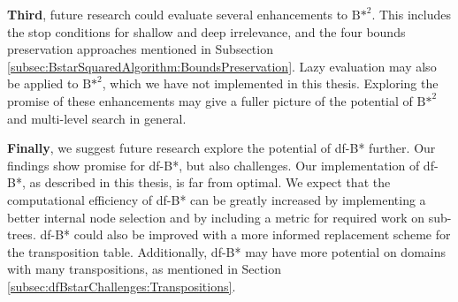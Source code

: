 \textbf{Third}, future research could evaluate several enhancements to ${\text{B*}}^2$. This includes the stop conditions for shallow and deep irrelevance, and the four bounds preservation approaches mentioned in Subsection \ref{subsec:BstarSquaredAlgorithm:BoundsPreservation}. Lazy evaluation may also be applied to ${\text{B*}}^2$, which we have not implemented in this thesis. Exploring the promise of these enhancements may give a fuller picture of the potential of ${\text{B*}}^2$ and multi-level search in general.

\textbf{Finally}, we suggest future research explore the potential of df-B* further.
Our findings show promise for df-B*, but also challenges. Our implementation of df-B*, as described in this thesis, is far from optimal. We expect that the computational efficiency of df-B* can be greatly increased by implementing a better internal node selection and by including a metric for required work on sub-trees. df-B* could also be improved with a more informed replacement scheme for the transposition table. Additionally, df-B* may have more potential on domains with many transpositions, as mentioned in Section \ref{subsec:dfBstarChallenges:Transpositions}.